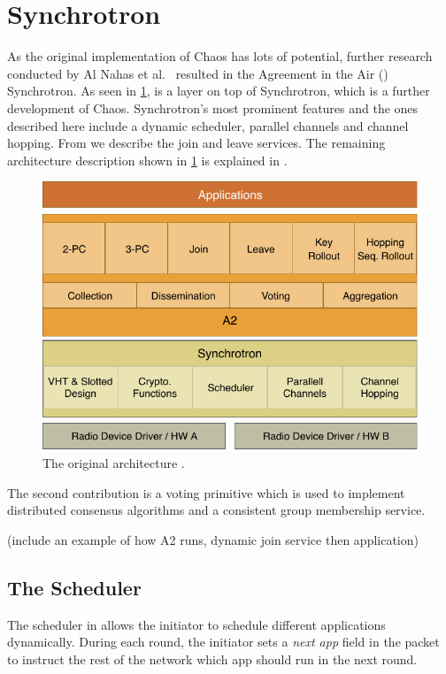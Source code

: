 \section{\atwo{} Synchrotron}
\label{sec:chaos-a2-background}
As the original implementation of Chaos has lots of potential, further research conducted by Al Nahas et al.~\cite{a2-introduction-paper} resulted in the Agreement in the Air (\atwo{}) Synchrotron.
As seen in \cref{fig:original-a2-architecture}, \atwo{} is a layer on top of Synchrotron, which is a further development of Chaos. Synchrotron's most prominent features and the ones described here include a dynamic scheduler, parallel channels and channel hopping. From \atwo{} we describe the join and leave services. The remaining architecture description shown in \cref{fig:original-a2-architecture} is explained in \cite{a2-introduction-paper}.

\begin{figure}[bt]
    \centering
    \includegraphics[scale=0.7]{figure/architecture_original_a2.pdf}
    \caption{The original \atwo{} architecture \cite{a2-introduction-paper}.}
    \label{fig:original-a2-architecture}
\end{figure}

The second contribution is a voting primitive which is used to implement distributed consensus algorithms and a consistent group membership service. 

(include an example of how A2 runs, dynamic join service then application)

\subsection{The Scheduler}
The scheduler in \atwo{} allows the initiator to schedule different applications dynamically. During each round, the initiator sets a \textit{next app} field in the packet to instruct the rest of the network which app should run in the next round.

